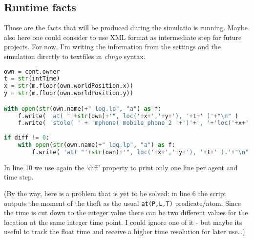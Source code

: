 \documentclass[11pt,a4paper]{article}
\begin{document}
\subsection{Runtime facts}
Those are the facts that will be produced during the simulatio is running.
Maybe also here one could consider to use XML format as intermediate step for future projects. For now, I'm writing the information from the settings and the simulation directly to textfiles in \textit{clingo} syntax. 
\begin{lstlisting}[language = Python, breaklines=true, caption={Log-file thief}]
own = cont.owner
t = str(intTime)
x = str(m.floor(own.worldPosition.x))
y = str(m.floor(own.worldPosition.y))

with open(str(own.name)+"_log.lp", "a") as f:
    f.write( 'at( "'+str(own)+'", loc('+x+','+y+'), '+t+' )'+"\n" )  
    f.write( 'stole( ' + 'mphone( mobile_phone_2 '+')'+', '+'loc('+x+','+y+')'+', '+ t +')'+'.' +"\n" ) 
    
if diff != 0:
    with open(str(own.name)+"_log.lp", "a") as f:
        f.write( 'at( "'+str(own)+'", loc('+x+','+y+'), '+t+' ).'+"\n" )    
\end{lstlisting}
In line 10 we use again the `diff' property to print only one line per agent and time step. 

(By the way, here is a problem that is yet to be solved: in line 6 the script outputs the moment of the theft as the usual \texttt{at(P,L,T)} predicate/atom. Since the time is cut down to the integer value there can be two different values for the location at the same integer time point. I could ignore one of it - but maybe its useful to track the float time and receive a higher time resolution for later use\dots)
\end{document}
